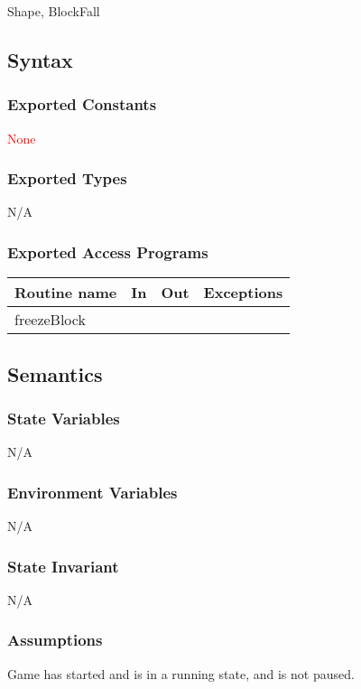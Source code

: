 \documentclass[12pt]{article}
\begin{document}
Shape, BlockFall

\subsection* {Syntax}

\subsubsection* {Exported Constants}
\textcolor{red}{None}
\subsubsection* {Exported Types}
N/A
\subsubsection* {Exported Access Programs}

\begin{tabular}{| l | l | l | l |}
\hline
\textbf{Routine name} & \textbf{In} & \textbf{Out} & \textbf{Exceptions}\\
\hline
freezeBlock &  &  & \\
\hline
\end{tabular}

\subsection* {Semantics}

\subsubsection* {State Variables}

N/A

\subsubsection* {Environment Variables}

N/A

\subsubsection* {State Invariant}

N/A

\subsubsection* {Assumptions}
Game has started and is in a running state, and is not paused.
\end{document}
